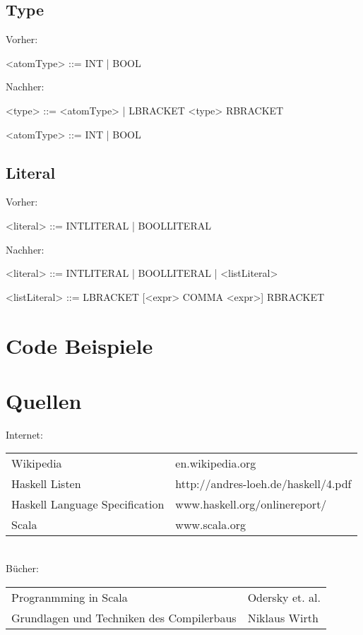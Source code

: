 \documentclass[a4paper,notitlepage,oneside]{scrartcl}
\begin{document}
\newpage


\subsection{Type}
Vorher:
\begin{grammar}
<atomType> ::= INT | BOOL
\end{grammar}
Nachher:
\begin{grammar}
<type> ::=  <atomType> | LBRACKET <type> RBRACKET

<atomType> ::= INT | BOOL
\end{grammar}

\subsection{Literal}
Vorher:
\begin{grammar}
<literal> ::= INTLITERAL | BOOLLITERAL
\end{grammar}
Nachher:
\begin{grammar}
<literal> ::= INTLITERAL | BOOLLITERAL | <listLiteral>

<listLiteral> ::= LBRACKET [<expr> {COMMA <expr>}] RBRACKET
\end{grammar}

\newpage
\section{Code Beispiele}

\newpage
\section{Quellen}
Internet:\\
\begin{tabular}{l l}
Wikipedia & en.wikipedia.org \\
Haskell Listen  & http://andres-loeh.de/haskell/4.pdf \\
Haskell Language Specification & www.haskell.org/onlinereport/ \\
Scala & www.scala.org
\end{tabular} \\
Bücher: \\
\begin{tabular}{l l}
Progranmming in Scala & Odersky et. al. \\
Grundlagen und Techniken des Compilerbaus & Niklaus Wirth \\
\end{tabular}
\end{document}
